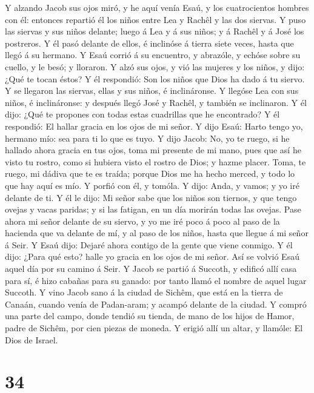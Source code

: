  Y alzando Jacob sus ojos miró, y he aquí venía Esaú, y los
cuatrocientos hombres con él: entonces repartió él los niños entre Lea y
Rachêl y las dos siervas.  Y puso las siervas y sus niños
delante; luego á Lea y á sus niños; y á Rachêl y á José los postreros.
 Y él pasó delante de ellos, é inclinóse á tierra siete
veces, hasta que llegó á su hermano.  Y Esaú corrió á su
encuentro, y abrazóle, y echóse sobre su cuello, y le besó; y lloraron.
 Y alzó sus ojos, y vió las mujeres y los niños, y dijo:
¿Qué te tocan éstos? Y él respondió: Son los niños que Dios ha dado á tu
siervo.  Y se llegaron las siervas, ellas y sus niños, é
inclináronse.  Y llegóse Lea con sus niños, é inclináronse:
y después llegó José y Rachêl, y también se inclinaron.  Y
él dijo: ¿Qué te propones con todas estas cuadrillas que he encontrado?
Y él respondió: El hallar gracia en los ojos de mi señor.  Y
dijo Esaú: Harto tengo yo, hermano mío: sea para ti lo que es tuyo.
 Y dijo Jacob: No, yo te ruego, si he hallado ahora gracia
en tus ojos, toma mi presente de mi mano, pues que así he visto tu
rostro, como si hubiera visto el rostro de Dios; y hazme placer.
 Toma, te ruego, mi dádiva que te es traída; porque Dios me
ha hecho merced, y todo lo que hay aquí es mío. Y porfió con él, y
tomóla.  Y dijo: Anda, y vamos; y yo iré delante de ti.
 Y él le dijo: Mi señor sabe que los niños son tiernos, y
que tengo ovejas y vacas paridas; y si las fatigan, en un día morirán
todas las ovejas.  Pase ahora mi señor delante de su
siervo, y yo me iré poco á poco al paso de la hacienda que va delante de
mí, y al paso de los niños, hasta que llegue á mi señor á Seir.
 Y Esaú dijo: Dejaré ahora contigo de la gente que viene
conmigo. Y él dijo: ¿Para qué esto? halle yo gracia en los ojos de mi
señor.  Así se volvió Esaú aquel día por su camino á Seir.
 Y Jacob se partió á Succoth, y edificó allí casa para sí,
é hizo cabañas para su ganado: por tanto llamó el nombre de aquel lugar
Succoth.  Y vino Jacob sano á la ciudad de Sichêm, que está
en la tierra de Canaán, cuando venía de Padan-aram; y acampó delante de
la ciudad.  Y compró una parte del campo, donde tendió su
tienda, de mano de los hijos de Hamor, padre de Sichêm, por cien piezas
de moneda.  Y erigió allí un altar, y llamóle: El Dios de
Israel.

\hypertarget{section-33}{%
\section{34}\label{section-33}}

